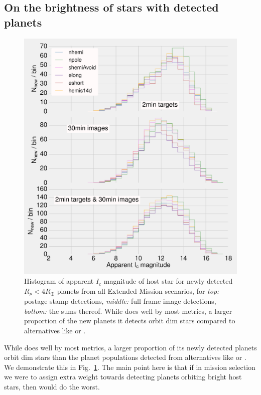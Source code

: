 \subsection{On the brightness of stars with detected planets}
\begin{figure}[!t]
	\centering
	\includegraphics[]{figures/160729_icmag_t50_all.pdf}
	\caption{Histogram of apparent $I_c$ magnitude of host star for newly detected $R_p<4R_\oplus$ planets from all Extended Mission scenarios, for \textit{top:} postage stamp detections, \textit{middle:} full frame image detections, \textit{bottom:} the sums thereof.
	While \npole\:does well by most metrics, a larger proportion of the new planets it detects orbit dim stars compared to alternatives like \hemis\:or \shemiAvoid.}
	\label{fig:icmag_meta}
\end{figure}
While \npole\:does well by most metrics, a larger proportion of its newly detected planets orbit dim stars than the planet populations detected from alternatives like \hemis\:or \shemiAvoid.
We demonstrate this in Fig.~\ref{fig:icmag_meta}.
The main point here is that if in mission selection we were to assign extra weight towards detecting planets orbiting bright host stars, then \npole\:would do the worst.
